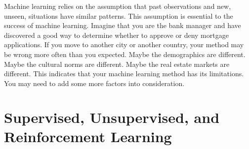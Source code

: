 Machine learning relies on the assumption that past observations and
new, unseen, situations have similar patterns.  This assumption is
essential to the success of machine learning.  Imagine that you are
the bank manager and have discovered a good way to determine whether
to approve or deny mortgage applications.  If you move to another city
or another country, your method may be wrong more often than you
expected. Maybe the demographics are different. Maybe the cultural
norms are different.  Maybe the real estate markets are different.
This indicates that your machine learning method has its limitations.
You may need to add some more factors into consideration.




\section{Supervised, Unsupervised, and Reinforcement Learning}

